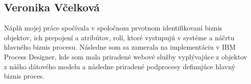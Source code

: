 \documentclass[10pt,oneside,slovak,a4paper]{article}
\begin{document}
\subsection{Veronika Včelková}
Náplň mojej práce spočívala v spoločnom prvotnom identifikovaní biznis objektov, ich prepojení a atribútov, rolí, ktoré vystupujú v systéme a náčrtu hlavného biznis procesu. Následne som sa zamerala na implementáciu v IBM Process Designer, kde som mala priradené webové služby vyplývajúce z objektov z nášho dátového modelu a následne priradené podprocesy definujúce hlavný biznis proces.
\end{document}
